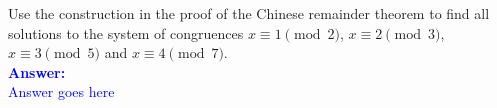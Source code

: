 \item{}
Use the construction in the proof of the Chinese remainder theorem to find all
solutions to the system of congruences $x\equiv1\pmod2$, $x\equiv2\pmod3$,
$x\equiv3\pmod5$ and $x\equiv4\pmod7$.
\\[12pt]
\ifanswers
\textcolor{blue}{
\textbf{Answer:}\\[6pt]
Answer goes here
}
\newpage
\fi
